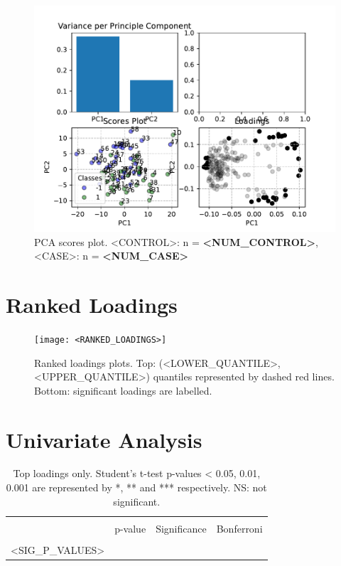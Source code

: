 \documentclass[]{article}
\begin{document}
    \begin{figure}[h!]
        \begin{center}
            \includegraphics{<SUMMARY_FIGS>}
        \end{center}
        \caption{PCA scores plot. <CONTROL>: n = \textbf{<NUM_CONTROL>}, <CASE>: n = \textbf{<NUM_CASE>}}
    \end{figure}

\newpage

\section*{Ranked Loadings}

    \begin{figure}[h!]
        \begin{center}
            \texttt{[image: <RANKED\_LOADINGS>]}
        \end{center}
        \caption{Ranked loadings plots. Top: (<LOWER_QUANTILE>, <UPPER_QUANTILE>) quantiles
        represented by dashed red lines. Bottom: significant loadings are labelled.}
    \end{figure}

\newpage

\section*{Univariate Analysis}

    \begin{longtable}{ c c c c }
    \caption{Top loadings only. Student's t-test p-values < 0.05, 0.01, 0.001 are represented by *, ** and 
    *** respectively. NS: not significant.} \label{tab:long} \\
    \hline \\
        & p-value & Significance & Bonferroni \\
    \hline \\
    \endfirsthead
    \endhead
    <SIG_P_VALUES>   
    \end{longtable}
\end{document}
